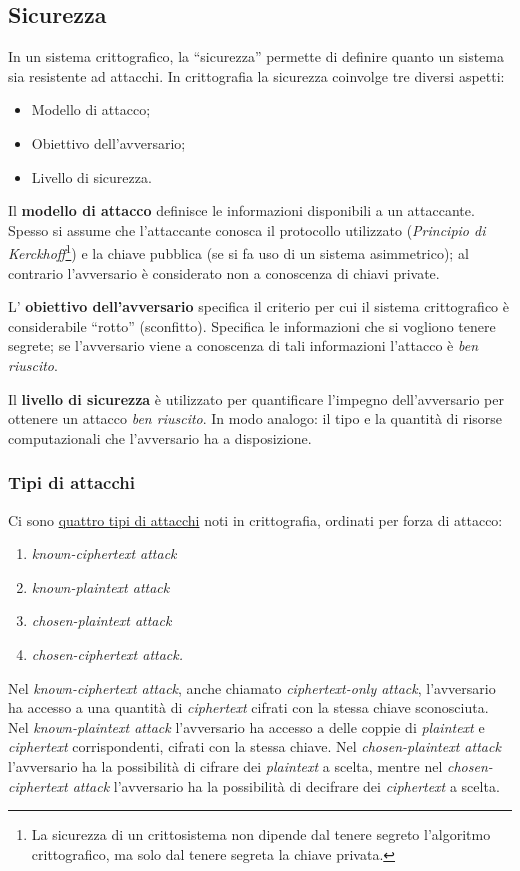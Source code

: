 \newpage
\subsection{Sicurezza}
In un sistema crittografico, la ``sicurezza'' permette di definire quanto un sistema sia resistente ad attacchi. In crittografia la sicurezza coinvolge tre diversi aspetti:
\begin{itemize}
    \item Modello di attacco;
    \item Obiettivo dell'avversario;
    \item Livello di sicurezza.
\end{itemize}
Il \textbf{modello di attacco} definisce le informazioni disponibili a un attaccante. Spesso si assume che l'attaccante conosca il protocollo utilizzato (\emph{Principio di Kerckhoff}\footnote{La sicurezza di un crittosistema non dipende dal tenere segreto l'algoritmo crittografico, ma solo dal tenere segreta la chiave privata.}) e la chiave pubblica (se si fa uso di un sistema asimmetrico); al contrario l'avversario è considerato non a conoscenza di chiavi private.

\noindent L' \textbf{obiettivo dell'avversario} specifica il criterio per cui il sistema crittografico è considerabile ``rotto'' (sconfitto). Specifica le informazioni che si vogliono tenere segrete; se l'avversario viene a conoscenza di tali informazioni l'attacco è \emph{ben riuscito}.

\noindent Il \textbf{livello di sicurezza} è utilizzato per quantificare l'impegno dell'avversario per ottenere un attacco \emph{ben riuscito}. In modo analogo: il tipo e la quantità di risorse computazionali che l'avversario ha a disposizione.

\subsubsection{Tipi di attacchi}
Ci sono \underline{quattro tipi di attacchi} noti in crittografia, ordinati per forza di attacco:
\begin{enumerate}
    \item \emph{known-ciphertext attack}
    \item \emph{known-plaintext attack}
    \item \emph{chosen-plaintext attack}
    \item \emph{chosen-ciphertext attack.}
\end{enumerate}
Nel \emph{known-ciphertext attack}, anche chiamato \emph{ciphertext-only attack}, l'avversario ha accesso a una quantità di \emph{ciphertext} cifrati con la stessa chiave sconosciuta. Nel \emph{known-plaintext attack} l'avversario ha accesso a delle coppie di \emph{plaintext} e \emph{ciphertext} corrispondenti, cifrati con la stessa chiave. Nel \emph{chosen-plaintext attack} l'avversario ha la possibilità di cifrare dei \emph{plaintext} a scelta, mentre nel \emph{chosen-ciphertext attack} l'avversario ha la possibilità di decifrare dei \emph{ciphertext} a scelta.

